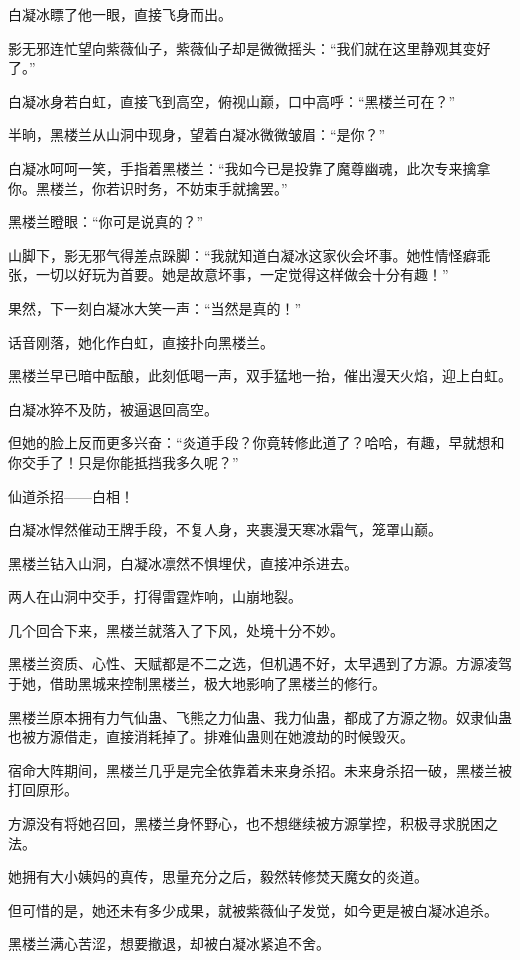 \begin{this_body}
白凝冰瞟了他一眼，直接飞身而出。

影无邪连忙望向紫薇仙子，紫薇仙子却是微微摇头：“我们就在这里静观其变好了。”

白凝冰身若白虹，直接飞到高空，俯视山巅，口中高呼：“黑楼兰可在？”

半晌，黑楼兰从山洞中现身，望着白凝冰微微皱眉：“是你？”

白凝冰呵呵一笑，手指着黑楼兰：“我如今已是投靠了魔尊幽魂，此次专来擒拿你。黑楼兰，你若识时务，不妨束手就擒罢。”

黑楼兰瞪眼：“你可是说真的？”

山脚下，影无邪气得差点跺脚：“我就知道白凝冰这家伙会坏事。她性情怪癖乖张，一切以好玩为首要。她是故意坏事，一定觉得这样做会十分有趣！”

果然，下一刻白凝冰大笑一声：“当然是真的！”

话音刚落，她化作白虹，直接扑向黑楼兰。

黑楼兰早已暗中酝酿，此刻低喝一声，双手猛地一抬，催出漫天火焰，迎上白虹。

白凝冰猝不及防，被逼退回高空。

但她的脸上反而更多兴奋：“炎道手段？你竟转修此道了？哈哈，有趣，早就想和你交手了！只是你能抵挡我多久呢？”

仙道杀招——白相！

白凝冰悍然催动王牌手段，不复人身，夹裹漫天寒冰霜气，笼罩山巅。

黑楼兰钻入山洞，白凝冰凛然不惧埋伏，直接冲杀进去。

两人在山洞中交手，打得雷霆炸响，山崩地裂。

几个回合下来，黑楼兰就落入了下风，处境十分不妙。

黑楼兰资质、心性、天赋都是不二之选，但机遇不好，太早遇到了方源。方源凌驾于她，借助黑城来控制黑楼兰，极大地影响了黑楼兰的修行。

黑楼兰原本拥有力气仙蛊、飞熊之力仙蛊、我力仙蛊，都成了方源之物。奴隶仙蛊也被方源借走，直接消耗掉了。排难仙蛊则在她渡劫的时候毁灭。

宿命大阵期间，黑楼兰几乎是完全依靠着未来身杀招。未来身杀招一破，黑楼兰被打回原形。

方源没有将她召回，黑楼兰身怀野心，也不想继续被方源掌控，积极寻求脱困之法。

她拥有大小姨妈的真传，思量充分之后，毅然转修焚天魔女的炎道。

但可惜的是，她还未有多少成果，就被紫薇仙子发觉，如今更是被白凝冰追杀。

黑楼兰满心苦涩，想要撤退，却被白凝冰紧追不舍。


\end{this_body}
